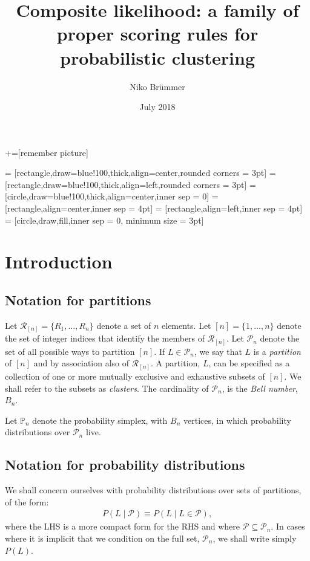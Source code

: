 \documentclass[a4paper,oneside,12pt,english]{article}
\def\Pset{\mathcal{P}}
\begin{document}
+=[remember picture]


 = [rectangle,draw=blue!100,thick,align=center,rounded corners = 3pt]
 = [rectangle,draw=blue!100,thick,align=left,rounded corners = 3pt]
 = [circle,draw=blue!100,thick,align=center,inner sep = 0]
 = [rectangle,align=center,inner sep = 4pt]
 = [rectangle,align=left,inner sep = 4pt]
 = [circle,draw,fill,inner sep = 0, minimum size = 3pt]

\def\Rset{\mathcal{R}}
\def\Pn{\Pset_n}
\def\Rn{\Rset_{[n]}}
\def\PP{\mathbb{P}}


\title{Composite likelihood: a family of proper scoring rules for probabilistic clustering}
\author{Niko Br\"ummer}
\date{July 2018}
\maketitle


\section{Introduction}

\subsection{Notation for partitions}
Let $\Rn=\{R_1,\ldots,R_n\}$ denote a set of $n$ elements. Let $[n]=\{1,\ldots,n\}$ denote the set of integer indices that identify the members of $\Rn$. Let $\Pset_n$ denote the set of all possible ways to partition $[n]$. If $L\in\Pset_n$, we say that $L$ is a \emph{partition} of $[n]$ and by association also of $\Rn$. A partition, $L$, can be specified as a collection of one or more mutually exclusive and exhaustive subsets of $[n]$. We shall refer to the subsets as \emph{clusters}. The cardinality of $\Pset_n$, is the \emph{Bell number}, $B_n$.

Let $\PP_n$ denote the probability simplex, with $B_n$ vertices, in which probability distributions over $\Pn$ live.




\subsection{Notation for probability distributions}
We shall concern ourselves with probability distributions over sets of partitions, of the form:
\begin{align}
P(L\mid\Pset) \equiv P(L\mid L\in\Pset), 
\end{align}
where the LHS is a more compact form for the RHS and where $\Pset\subseteq\Pn$. In cases where it is implicit that we condition on the full set, $\Pn$, we shall write simply $P(L)$.
\end{document}
